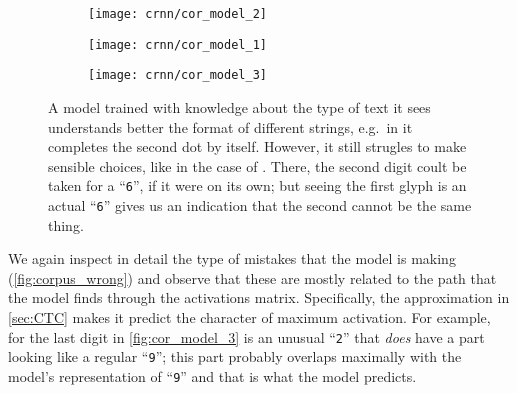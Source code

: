 			\begin{figure}
				\begin{subfigure}[b]{.3\linewidth}
					\texttt{[image: crnn/cor\_model\_2]}
					\caption{}\label{fig:cor_model_2}
				\end{subfigure}
				\begin{subfigure}[b]{.3\linewidth}
					\texttt{[image: crnn/cor\_model\_1]}
					\caption{}\label{fig:cor_model_1}
				\end{subfigure}
				\begin{subfigure}[b]{.3\linewidth}
					\texttt{[image: crnn/cor\_model\_3]}
					\caption{}\label{fig:cor_model_3}
				\end{subfigure}
				\caption[Understandably wrong predictions (2)]{A model trained with knowledge about the type of text it sees understands better the format of different strings, e.g.\ in  it completes the second dot by itself. However, it still strugles to make sensible choices, like in the case of . There, the second digit coult be taken for a ``\texttt{6}'', if it were on its own; but seeing the first glyph is an actual ``\texttt{6}'' gives us an indication that the second cannot be the same thing.}\label{fig:corpus_wrong}
			\end{figure}
			We again inspect in detail the type of mistakes that the model is making (\autoref{fig:corpus_wrong}) and observe that these are mostly related to the path that the model finds through the activations matrix. Specifically, the approximation in \autoref{sec:CTC} makes it predict the character of maximum activation. For example, for the last digit in \autoref{fig:cor_model_3} is an unusual ``\texttt{2}'' that \emph{does} have a part looking like a regular ``\texttt{9}''; this part probably overlaps maximally with the model's representation of ``\texttt{9}'' and that is what the model predicts.


